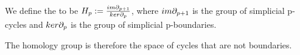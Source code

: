 \documentclass[../1.tex]{subfiles}
\begin{document}
    \begin{defn}
        We define the  to be $H_p := \frac{im\partial_{p+1}}{ker\partial_p}$, where $im\partial_{p+1}$ is the group of simplicial p-cycles and
        $ker\partial_p$ is the group of simplicial p-boundaries.
    \end{defn}

    The homology group is therefore the space of cycles that are not boundaries.
\end{document}
